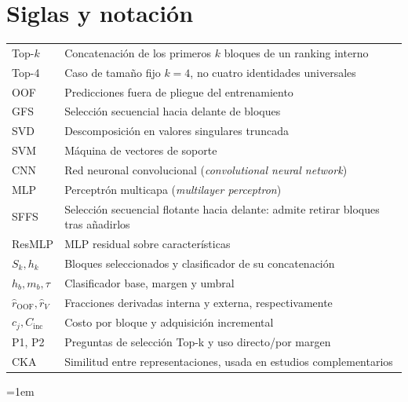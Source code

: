 \documentclass[12pt,a4paper]{report}
\begin{document}
\chapter*{Siglas y notación}
\begin{tabular}{@{}lp{10.6cm}@{}}
Top-\(k\) & Concatenación de los primeros \(k\) bloques de un ranking interno\\
Top-4 & Caso de tamaño fijo \(k=4\), no cuatro identidades universales\\
OOF & Predicciones fuera de pliegue del entrenamiento\\
GFS & Selección secuencial hacia delante de bloques\\
SVD & Descomposición en valores singulares truncada\\
SVM & Máquina de vectores de soporte\\
CNN & Red neuronal convolucional (\emph{convolutional neural network})\\
MLP & Perceptrón multicapa (\emph{multilayer perceptron})\\
SFFS & Selección secuencial flotante hacia delante: admite retirar bloques tras añadirlos\\
ResMLP & MLP residual sobre características\\
\(S_k,h_k\) & Bloques seleccionados y clasificador de su concatenación\\
\(h_b,m_b,\tau\) & Clasificador base, margen y umbral\\
\(\widehat r_{\mathrm{OOF}},\widehat r_V\) & Fracciones derivadas interna y externa, respectivamente\\
\(c_j,C_{\mathrm{inc}}\) & Costo por bloque y adquisición incremental\\
P1, P2 & Preguntas de selección Top-k y uso directo/por margen\\
CKA & Similitud entre representaciones, usada en estudios complementarios\\
\end{tabular}
\tableofcontents
\listoffigures
{\emergencystretch=1em\listoftables}
\clearpage
{}








\appendix






\clearpage

\setlength{\bibsep}{3pt plus 1pt}

\end{document}
